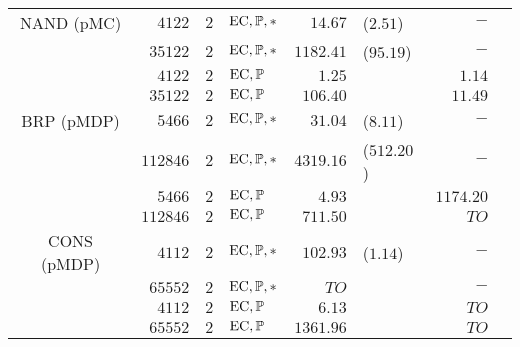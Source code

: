 \begin{tabular}[b]{@{}crrlrlrr@{}}
NAND (pMC)  & $4122$   &  $2$    & $\mathrm{EC},\mathbb{P},*$    & $14.67$ &($2.51$) & $-$                   \\
   & $35122$   &  $2$    & $\mathrm{EC},\mathbb{P},*$    & $1182.41$ &($95.19$) & $-$                  \\
   & $4122$   &  $2$    & $\mathrm{EC},\mathbb{P}$    & $1.25$   && $1.14$                   \\
  & $35122$   &  $2$    & $\mathrm{EC},\mathbb{P}$    & $106.40$  && $11.49$                  \\
BRP (pMDP)   & $5466$   &  $2$    & $\mathrm{EC},\mathbb{P},*$    & $31.04$ &($8.11$) & $-$                   \\      
   & $112846$   &  $2$    & $\mathrm{EC},\mathbb{P},*$    & $4319.16$  &($512.20$) & $-$                   \\    
   & $5466$   &  $2$    & $\mathrm{EC},\mathbb{P}$    & $4.93$  && $1174.20$                   \\      
   & $112846$   &  $2$    & $\mathrm{EC},\mathbb{P}$    & $711.50$   && $\mathit{TO}$                   \\  
CONS (pMDP)  & $4112$   &  $2$    & $\mathrm{EC},\mathbb{P},*$    & $102.93$  &($1.14$) & $-$                   \\      
   & $65552$   &  $2$    & $\mathrm{EC},\mathbb{P},*$    & $\mathit{TO}$  &&  $-$                   \\    
   & $4112$   &  $2$    & $\mathrm{EC},\mathbb{P}$    & $6.13$   && $\mathit{TO}$                   \\      
   & $65552$   &  $2$    & $\mathrm{EC},\mathbb{P}$    & $1361.96$  & & $\mathit{TO}$                   \\  
\bottomrule\end{tabular}
